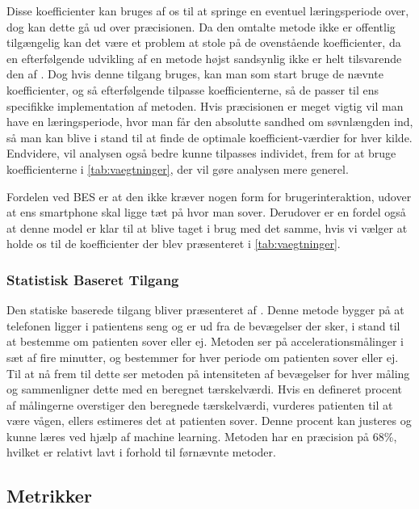 Disse koefficienter kan bruges af os til at springe en eventuel læringsperiode over, dog kan dette gå ud over præcisionen. 
Da den omtalte metode ikke er offentlig tilgængelig kan det være et problem at stole på de ovenstående koefficienter, da en efterfølgende udvikling af en metode højst sandsynlig ikke er helt tilsvarende den af \citet{6563918}.
Dog hvis denne tilgang bruges, kan man som start bruge de nævnte koefficienter, og så efterfølgende tilpasse koefficienterne, så de passer til ens specifikke implementation af metoden.
Hvis præcisionen er meget vigtig vil man have en læringsperiode, hvor man får den absolutte sandhed om søvnlængden ind, så man kan blive i stand til at finde de optimale koefficient-værdier for hver kilde.
Endvidere, vil analysen også bedre kunne tilpasses individet, frem for at bruge koefficienterne i \cref{tab:vaegtninger}, der vil gøre analysen mere generel.

Fordelen ved BES er at den ikke kræver nogen form for brugerinteraktion, udover at ens smartphone skal ligge tæt på hvor man sover.
Derudover er en fordel også at denne model er klar til at blive taget i brug med det samme, hvis vi vælger at holde os til de koefficienter der blev præsenteret i \cref{tab:vaegtninger}.

\subsubsection{Statistisk Baseret Tilgang}\label{sec:statbased}
Den statiske baserede tilgang bliver præsenteret af \citet{misc:statbased}.
Denne metode bygger på at telefonen ligger i patientens seng og er ud fra de bevægelser der sker, i stand til at bestemme om patienten sover eller ej. 
Metoden ser på accelerationsmålinger i sæt af fire minutter, og bestemmer for hver periode om patienten sover eller ej.
Til at nå frem til dette ser metoden på intensiteten af bevægelser for hver måling og sammenligner dette med en beregnet tærskelværdi.
Hvis en defineret procent af målingerne overstiger den beregnede tærskelværdi, vurderes patienten til at være vågen, ellers estimeres det at patienten sover.
Denne procent kan justeres og kunne læres ved hjælp af machine learning.
Metoden har en præcision på 68\%, hvilket er relativt lavt i forhold til førnævnte metoder.

\subsection{Metrikker}\label{sec:metrikker}
